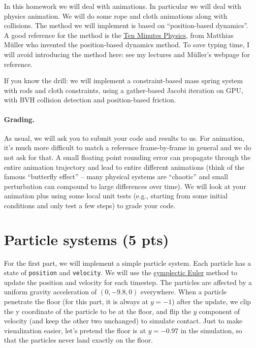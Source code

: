 




In this homework we will deal with animations. 
In particular we will deal with physics animation. 
We will do some rope and cloth animations along with collisions.
The method we will implement is based on ``position-based dynamics''.
A good reference for the method is the \href{https://matthias-research.github.io/pages/tenMinutePhysics/index.html}{Ten Minutes Physics}, from Matthias Müller who invented the position-based dynamics method. To save typing time, I will avoid introducing the method here: see my lectures and Müller's webpage for reference. 

If you know the drill: we will implement a constraint-based mass spring system with rods and cloth constraints, using a gather-based Jacobi iteration on GPU, with BVH collision detection and position-based friction.

\paragraph{Grading.} As usual, we will ask you to submit your code and results to us. For animation, it's much more difficult to match a reference frame-by-frame in general and we do not ask for that. A small floating point rounding error can propagate through the entire animation trajectory and lead to entire different animations (think of the famous ``butterfly effect'' -- many physical systems are ``chaotic'' and small perturbation can compound to large differences over time). We will look at your animation plus using some local unit tests (e.g., starting from some initial conditions and only test a few steps) to grade your code.

\section{Particle systems (5 pts)}

For the first part, we will implement a simple particle system. Each particle has a state of \lstinline{position} and \lstinline{velocity}.
We will use the \href{https://en.wikipedia.org/wiki/Semi-implicit_Euler_method}{symplectic Euler} method to update the position and velocity for each timestep. The particles are affected by a uniform gravity acceleration of $(0, -9.8, 0)$ everywhere. 
When a particle penetrate the floor (for this part, it is always at $y=-1$) after the update, we clip the y coordinate of the particle to be at the floor, and flip the $y$ component of velocity (and keep the other two unchanged) to simulate contact.
Just to make visualization easier, let's pretend the floor is at $y=-0.97$ in the simulation, so that the particles never land exactly on the floor.

